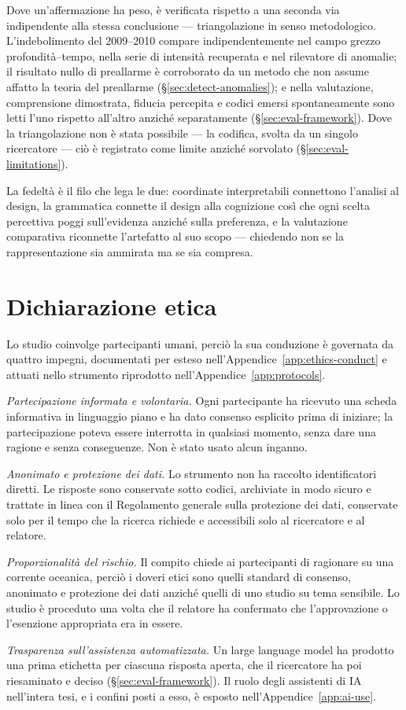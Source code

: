 Dove un'affermazione ha peso, è verificata rispetto a una seconda via indipendente alla stessa conclusione --- triangolazione in senso metodologico. L'indebolimento del 2009--2010 compare indipendentemente nel campo grezzo profondità--tempo, nella serie di intensità recuperata e nel rilevatore di anomalie; il risultato nullo di preallarme è corroborato da un metodo che non assume affatto la teoria del preallarme (\S\ref{sec:detect-anomalies}); e nella valutazione, comprensione dimostrata, fiducia percepita e codici emersi spontaneamente sono letti l'uno rispetto all'altro anziché separatamente (\S\ref{sec:eval-framework}). Dove la triangolazione non è stata possibile --- la codifica, svolta da un singolo ricercatore --- ciò è registrato come limite anziché sorvolato (\S\ref{sec:eval-limitations}).

La fedeltà è il filo che lega le due: coordinate interpretabili connettono l'analisi al design, la grammatica connette il design alla cognizione così che ogni scelta percettiva poggi sull'evidenza anziché sulla preferenza, e la valutazione comparativa riconnette l'artefatto al suo scopo --- chiedendo non se la rappresentazione sia ammirata ma se sia compresa.

\section{Dichiarazione etica}
\label{sec:ethics-statement}

Lo studio coinvolge partecipanti umani, perciò la sua conduzione è governata da quattro impegni,
documentati per esteso nell'Appendice~\ref{app:ethics-conduct} e attuati nello strumento
riprodotto nell'Appendice~\ref{app:protocols}.

\emph{Partecipazione informata e volontaria.} Ogni partecipante ha ricevuto una scheda
informativa in linguaggio piano e ha dato consenso esplicito prima di iniziare; la partecipazione
poteva essere interrotta in qualsiasi momento, senza dare una ragione e senza conseguenze. Non è
stato usato alcun inganno.

\emph{Anonimato e protezione dei dati.} Lo strumento non ha raccolto identificatori diretti. Le
risposte sono conservate sotto codici, archiviate in modo sicuro e trattate in linea con il
Regolamento generale sulla protezione dei dati, conservate solo per il tempo che la ricerca
richiede e accessibili solo al ricercatore e al relatore.

\emph{Proporzionalità del rischio.} Il compito chiede ai partecipanti di ragionare su una corrente
oceanica, perciò i doveri etici sono quelli standard di consenso, anonimato e protezione dei dati
anziché quelli di uno studio su tema sensibile. Lo studio è proceduto una volta che il relatore ha
confermato che l'approvazione o l'esenzione appropriata era in essere.

\emph{Trasparenza sull'assistenza automatizzata.} Un large language model ha prodotto una prima
etichetta per ciascuna risposta aperta, che il ricercatore ha poi riesaminato e deciso
(\S\ref{sec:eval-framework}). Il ruolo degli assistenti di IA nell'intera tesi, e i confini posti a
esso, è esposto nell'Appendice~\ref{app:ai-use}.
